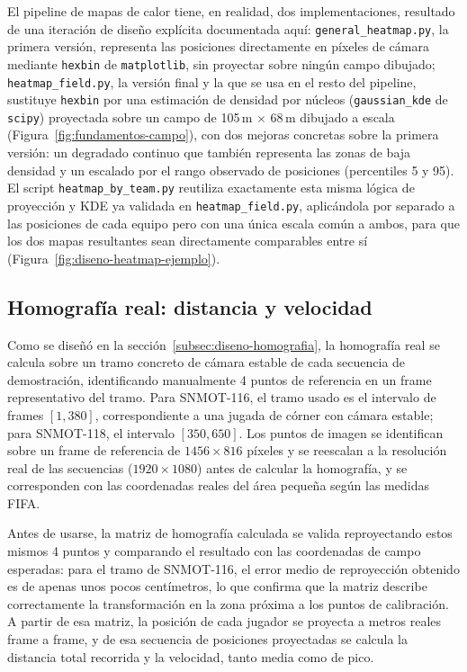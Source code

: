 El pipeline de mapas de calor tiene, en realidad, dos implementaciones, resultado de una iteración de diseño explícita
documentada aquí: \texttt{general\_heatmap.py},
la primera versión, representa las posiciones directamente en píxeles de
cámara mediante \texttt{hexbin} de \texttt{matplotlib}, sin proyectar sobre
ningún campo dibujado; \texttt{heatmap\_field.py}, la versión final y la
que se usa en el resto del pipeline, sustituye \texttt{hexbin}
por una estimación de densidad por núcleos (\texttt{gaussian\_kde} de
\texttt{scipy}) proyectada sobre un campo de 105\,m $\times$ 68\,m dibujado
a escala (Figura~\ref{fig:fundamentos-campo}), con dos mejoras
concretas sobre la primera versión: un degradado continuo que también
representa las zonas de baja densidad y un escalado por el rango
observado de posiciones (percentiles 5 y 95). El script \texttt{heatmap\_by\_team.py}
reutiliza exactamente esta misma lógica de proyección y KDE ya validada en
\texttt{heatmap\_field.py}, aplicándola por separado a las posiciones de
cada equipo pero con una única escala
común a ambos, para que los dos mapas resultantes sean directamente
comparables entre sí (Figura~\ref{fig:diseno-heatmap-ejemplo}).

\subsection{Homografía real: distancia y velocidad}
\label{sec:implementacion-homografia}

Como se diseñó en la sección~\ref{subsec:diseno-homografia}, la homografía
real se calcula sobre un tramo concreto de cámara estable de cada secuencia
de demostración, identificando manualmente 4 puntos
de referencia en un frame representativo
del tramo. Para SNMOT-116, el tramo usado es el intervalo de frames
$[1, 380]$, correspondiente a una jugada de córner con cámara estable; para
SNMOT-118, el intervalo $[350, 650]$. Los puntos de imagen se identifican
sobre un frame de referencia de $1456 \times 816$ píxeles y se reescalan a
la resolución real de las secuencias ($1920 \times 1080$) antes de calcular
la homografía, y se corresponden con las coordenadas reales del área
pequeña según las medidas FIFA.

Antes de usarse, la matriz de homografía calculada se valida
reproyectando estos mismos 4 puntos y comparando el resultado con las
coordenadas de campo esperadas: para el tramo de SNMOT-116, el error medio
de reproyección obtenido es de apenas unos pocos centímetros, lo que
confirma que la matriz describe correctamente la transformación en la zona
próxima a los puntos de calibración.
A partir de esa matriz, la posición de cada jugador se proyecta a
metros reales frame a frame, y de esa secuencia de posiciones proyectadas
se calcula la distancia total recorrida y la velocidad, tanto media como de pico.

